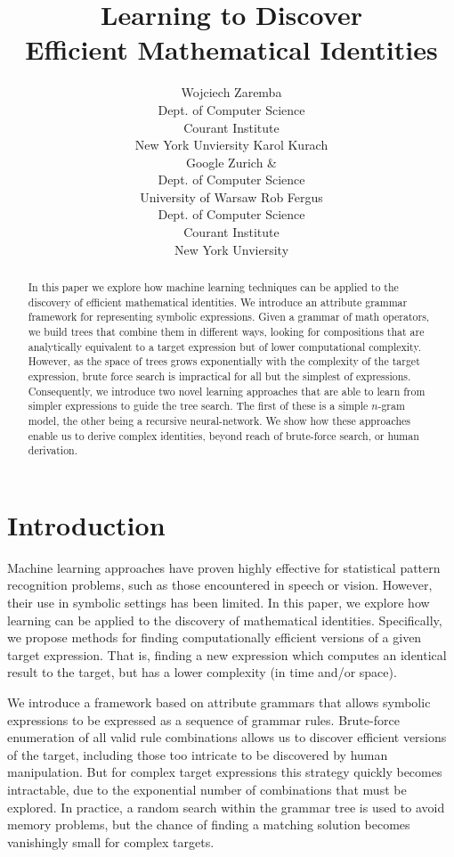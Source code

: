 \documentclass{article} %
\title{Learning to Discover\\ Efficient Mathematical Identities}
\author{
Wojciech Zaremba\\
Dept. of Computer Science\\
Courant Institute\\
New York Unviersity
\And
Karol Kurach\\
Google Zurich \& \\
Dept. of Computer Science\\
University of Warsaw
\And
Rob Fergus \\
Dept. of Computer Science\\
Courant Institute\\
New York Unviersity
}
\begin{document}
\maketitle

\vspace{-5mm}
\begin{abstract}
  In this paper we explore how machine learning techniques can be
  applied to the discovery of efficient mathematical identities. We
  introduce an attribute grammar framework for representing symbolic
  expressions. Given a grammar of math operators, we build trees that
  combine them in different ways, looking for compositions that are analytically equivalent to a target
  expression but of lower computational complexity. However, as the
  space of trees grows exponentially with the complexity of the
  target expression, brute force search is impractical for all but the
  simplest of expressions. Consequently, we introduce two novel
  learning approaches that are able to learn from simpler expressions
  to guide the tree search. The first of these is a simple $n$-gram
  model, the other being a recursive neural-network. We show how
  these approaches enable us to derive complex identities, beyond
  reach of brute-force search, or human derivation.
\end{abstract}

\vspace{-2mm}
\section{Introduction}
\vspace{-2mm} 
Machine learning approaches have proven highly effective for
statistical pattern recognition problems, such as those encountered in
speech or vision. However, their use in symbolic settings has been
limited. In this paper, we explore how learning can be applied to the
discovery of mathematical identities. Specifically, we propose
methods for finding computationally efficient versions of a given target
expression. That is, finding a new expression which computes an identical
result to the target, but has a lower complexity (in time and/or
space). 



We introduce a framework based on attribute grammars
\cite{knuth1968semantics} that allows symbolic expressions to be
expressed as a sequence of grammar rules. 
Brute-force enumeration of all valid rule combinations
allows us to discover efficient versions of the target, including
those too intricate to be discovered by human manipulation. But
for complex target expressions this strategy quickly
becomes intractable, due to the exponential number of combinations that
must be explored. In practice, a random search within the grammar tree
is used to avoid memory problems, but the chance of finding a matching
solution becomes vanishingly small for complex targets.
\end{document}
